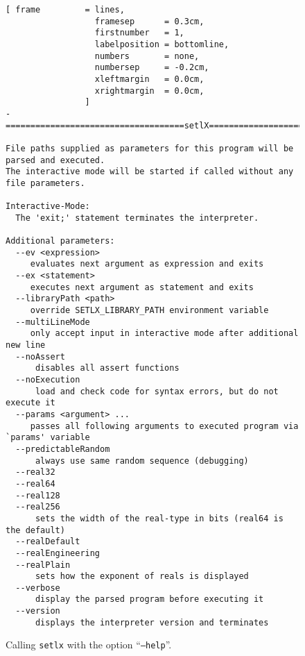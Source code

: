 \begin{figure}[!ht]
\centering
\begin{Verbatim}[ frame         = lines, 
                  framesep      = 0.3cm, 
                  firstnumber   = 1,
                  labelposition = bottomline,
                  numbers       = none,
                  numbersep     = -0.2cm,
                  xleftmargin   = 0.0cm,
                  xrightmargin  = 0.0cm,
                ]
-====================================setlX=============================v1.6.0=-

File paths supplied as parameters for this program will be parsed and executed.
The interactive mode will be started if called without any file parameters.

Interactive-Mode:
  The 'exit;' statement terminates the interpreter.

Additional parameters:
  --ev <expression>
     evaluates next argument as expression and exits
  --ex <statement>
     executes next argument as statement and exits
  --libraryPath <path>
     override SETLX_LIBRARY_PATH environment variable
  --multiLineMode
     only accept input in interactive mode after additional new line
  --noAssert
      disables all assert functions
  --noExecution
      load and check code for syntax errors, but do not execute it
  --params <argument> ...
     passes all following arguments to executed program via `params' variable
  --predictableRandom
      always use same random sequence (debugging)
  --real32
  --real64
  --real128
  --real256
      sets the width of the real-type in bits (real64 is the default)
  --realDefault
  --realEngineering
  --realPlain
      sets how the exponent of reals is displayed
  --verbose
      display the parsed program before executing it
  --version
      displays the interpreter version and terminates
\end{Verbatim}
\vspace*{-0.3cm}
\caption{Calling \texttt{setlx} with the option ``\texttt{--help}''.}
\label{fig:help-option}
\end{figure}


